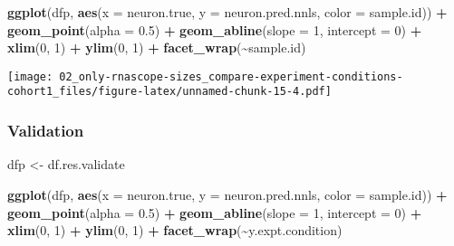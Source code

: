 \documentclass[
]{article}
\newenvironment{Shaded}{\begin{snugshade}}{\end{snugshade}}
\newcommand{\AttributeTok}[1]{\textcolor[rgb]{0.13,0.29,0.53}{#1}}
\newcommand{\DecValTok}[1]{\textcolor[rgb]{0.00,0.00,0.81}{#1}}
\newcommand{\FloatTok}[1]{\textcolor[rgb]{0.00,0.00,0.81}{#1}}
\newcommand{\FunctionTok}[1]{\textcolor[rgb]{0.13,0.29,0.53}{\textbf{#1}}}
\newcommand{\NormalTok}[1]{#1}
\newcommand{\OtherTok}[1]{\textcolor[rgb]{0.56,0.35,0.01}{#1}}
\newcommand{\SpecialCharTok}[1]{\textcolor[rgb]{0.81,0.36,0.00}{\textbf{#1}}}
\begin{document}
\begin{Shaded}
\begin{Highlighting}[]
\FunctionTok{ggplot}\NormalTok{(dfp, }\FunctionTok{aes}\NormalTok{(}\AttributeTok{x =}\NormalTok{ neuron.true, }\AttributeTok{y =}\NormalTok{ neuron.pred.nnls, }\AttributeTok{color =}\NormalTok{ sample.id)) }\SpecialCharTok{+} 
  \FunctionTok{geom\_point}\NormalTok{(}\AttributeTok{alpha =} \FloatTok{0.5}\NormalTok{) }\SpecialCharTok{+} \FunctionTok{geom\_abline}\NormalTok{(}\AttributeTok{slope =} \DecValTok{1}\NormalTok{, }\AttributeTok{intercept =} \DecValTok{0}\NormalTok{) }\SpecialCharTok{+}
  \FunctionTok{xlim}\NormalTok{(}\DecValTok{0}\NormalTok{, }\DecValTok{1}\NormalTok{) }\SpecialCharTok{+} \FunctionTok{ylim}\NormalTok{(}\DecValTok{0}\NormalTok{, }\DecValTok{1}\NormalTok{) }\SpecialCharTok{+} \FunctionTok{facet\_wrap}\NormalTok{(}\SpecialCharTok{\textasciitilde{}}\NormalTok{sample.id)}
\end{Highlighting}
\end{Shaded}

\texttt{[image: 02\_only-rnascope-sizes\_compare-experiment-conditions-cohort1\_files/figure-latex/unnamed-chunk-15-4.pdf]}

\hypertarget{validation}{%
\subsubsection{Validation}\label{validation}}

\begin{Shaded}
\begin{Highlighting}[]
\NormalTok{dfp }\OtherTok{\textless{}{-}}\NormalTok{ df.res.validate}

\FunctionTok{ggplot}\NormalTok{(dfp, }\FunctionTok{aes}\NormalTok{(}\AttributeTok{x =}\NormalTok{ neuron.true, }\AttributeTok{y =}\NormalTok{ neuron.pred.nnls, }\AttributeTok{color =}\NormalTok{ sample.id)) }\SpecialCharTok{+} 
  \FunctionTok{geom\_point}\NormalTok{(}\AttributeTok{alpha =} \FloatTok{0.5}\NormalTok{) }\SpecialCharTok{+} \FunctionTok{geom\_abline}\NormalTok{(}\AttributeTok{slope =} \DecValTok{1}\NormalTok{, }\AttributeTok{intercept =} \DecValTok{0}\NormalTok{) }\SpecialCharTok{+}
  \FunctionTok{xlim}\NormalTok{(}\DecValTok{0}\NormalTok{, }\DecValTok{1}\NormalTok{) }\SpecialCharTok{+} \FunctionTok{ylim}\NormalTok{(}\DecValTok{0}\NormalTok{, }\DecValTok{1}\NormalTok{) }\SpecialCharTok{+} \FunctionTok{facet\_wrap}\NormalTok{(}\SpecialCharTok{\textasciitilde{}}\NormalTok{y.expt.condition)}
\end{Highlighting}
\end{Shaded}
\end{document}
